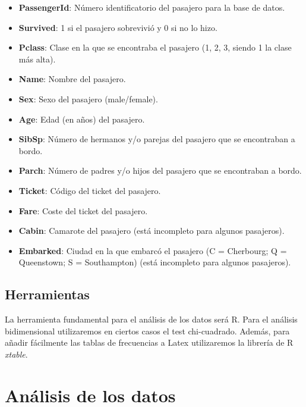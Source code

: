 \documentclass{article}
\begin{document}
\begin{itemize}
    \item \textbf{PassengerId}: Número identificatorio del pasajero para la base de datos.
    \item \textbf{Survived}: 1 si el pasajero sobrevivió y 0 si no lo hizo.
    \item \textbf{Pclass}: Clase en la que se encontraba el pasajero (1, 2, 3, siendo 1 la clase más alta).
    \item \textbf{Name}: Nombre del pasajero.
    \item \textbf{Sex}: Sexo del pasajero (male/female).
    \item \textbf{Age}: Edad (en años) del pasajero.
    \item \textbf{SibSp}: Número de hermanos y/o parejas del pasajero que se encontraban a bordo.
    \item \textbf{Parch}: Número de padres y/o hijos del pasajero que se encontraban a bordo.
    \item \textbf{Ticket}: Código del ticket del pasajero.
    \item \textbf{Fare}: Coste del ticket del pasajero.
    \item \textbf{Cabin}: Camarote del pasajero (está incompleto para algunos pasajeros).
    \item \textbf{Embarked}: Ciudad en la que embarcó el pasajero (C = Cherbourg; Q = Queenstown; S = Southampton) (está incompleto para algunos pasajeros).
\end{itemize}

\subsection{Herramientas}

La herramienta fundamental para el análisis de los datos será R. Para el análisis bidimensional utilizaremos en ciertos casos el test chi-cuadrado. Además, para añadir fácilmente las tablas de frecuencias a Latex utilizaremos la librería de R \textit{xtable}.

\section{Análisis de los datos}
\end{document}
